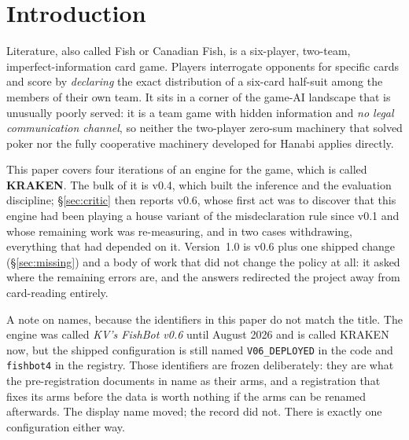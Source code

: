 \documentclass[11pt,letterpaper]{article}
\begin{document}
\setcounter{tocdepth}{2}
\tableofcontents
\clearpage

\section{Introduction}
\label{sec:intro}

Literature, also called Fish or Canadian Fish, is a six-player,
two-team, imperfect-information card game. Players interrogate opponents for
specific cards and score by \emph{declaring} the exact distribution of a
six-card half-suit among the members of their own team. It sits in a corner of
the game-AI landscape that is unusually poorly served: it is a team game with
hidden information and \emph{no legal communication channel}, so neither the
two-player zero-sum machinery that solved poker nor the fully cooperative
machinery developed for Hanabi applies directly.

This paper covers four iterations of an engine for the game, which is called
\textbf{KRAKEN}. The bulk of it is v0.4, which built the inference and the
evaluation discipline; \S\ref{sec:critic} then reports v0.6, whose first act
was to discover that this engine had been playing a house variant of the
misdeclaration rule since v0.1 and whose remaining work was re-measuring, and
in two cases withdrawing, everything that had depended on it. Version~1.0 is
v0.6 plus one shipped change (\S\ref{sec:missing}) and a body of work that
did not change the policy at all: it asked where the remaining errors are, and
the answers redirected the project away from card-reading entirely.

A note on names, because the identifiers in this paper do not match the title.
The engine was called \emph{KV's FishBot v0.6} until August 2026 and is called
KRAKEN now, but the shipped configuration is still named
\texttt{V06\_DEPLOYED} in the code and \texttt{fishbot4} in the registry.
Those identifiers are frozen deliberately: they are what the pre-registration
documents in  name as their arms, and a registration that fixes
its arms before the data is worth nothing if the arms can be renamed
afterwards. The display name moved; the record did not. There is exactly one
configuration either way.
\end{document}

